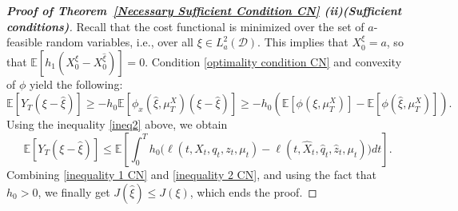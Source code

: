 \documentclass[11pt,a4paper]{article}
\begin{document}
\begin{proof} [\textup{\textbf{Proof of Theorem~\ref{Necessary Sufficient Condition CN} (ii)(Sufficient conditions)}}]
Recall that the cost functional is minimized over the set of $a$-feasible random variables, i.e., over all $\xi \in L^2_a (\mathcal D)$. This implies that  $X_0^\xi=a$, so that $\mathbb E\left[h_1 (X_0^\xi-X_0^{\hat \xi}) \right]=0$. Condition \eqref{optimality condition CN} and convexity of $\phi$ yield the following:
\begin{equation}
\label{inequality 1 CN}
\mathbb E\left[Y_T( \xi-\hat \xi ) \right] \geq -h_0\mathbb E \left[\phi_x(\hat \xi,\mu_T^X)(\xi-\hat \xi ) \right] \geq -h_0 \left(\mathbb E \left[\phi(\xi,\mu_T^X)\right] - \mathbb E \left[\phi(\hat \xi,\mu_T^X)\right]\right).
\end{equation}
Using the inequality \eqref{ineq2} above, we obtain
\begin{equation}
\label{inequality 2 CN}
 \mathbb E \left[ Y_T( \xi-\hat \xi ) \right]\leq
 \mathbb E \left[\int_0^T h_0 \Big( \ell(t, X_t, q_t, z_t, \mu_t) - \ell(t, \hat X_t, \hat q_t, \hat z_t, \mu_t)\Big) dt\right].
\end{equation}
Combining \eqref{inequality 1 CN} and \eqref{inequality 2 CN}, and using the fact that $h_0 > 0$, we finally get
$J(\hat \xi) \leq J(\xi)$, which ends the proof.
\end{proof}
\end{document}
